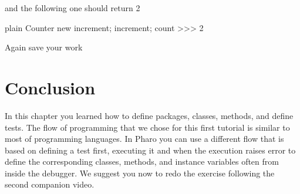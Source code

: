 \documentclass[10pt,twoside,english]{_support/latex/sbabook/sbabook}
\begin{document}
and the following one should return 2

\begin{displaycode}{plain}
Counter new increment; increment; count
>>> 2
\end{displaycode}

Again save your work
\section{Conclusion}
In this chapter you learned how to define packages, classes, methods, and define tests.
The flow of programming that we chose for this first tutorial is similar to most of programming languages.
In Pharo you can use a different flow that is based on defining a test first, executing it and when the execution raises error to define the corresponding classes, methods, and instance variables often from inside the debugger. We suggest you now to redo the exercise following the second companion video.



\backmatter



\end{document}
